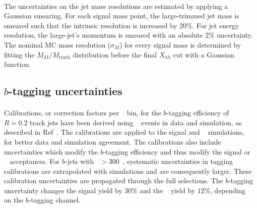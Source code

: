 \paragraph{}
The uncertainties on the jet mass resolutions are estimated by applying a Gaussian smearing.
For each signal mass point, the large-\R trimmed jet mass is smeared such that the intrinsic resolution is increased by 20\%. 
For jet energy resolution, the large-\R jet's momentum is smeared with an absolute $2\%$ uncertainty. 
The nominal MC mass resolution ($\sigma_{M}$) for every signal mass is determined by fitting the $M_\text{JJ} / M_\text{truth}$ distribution before the final $X_{hh}$ cut with a Gaussian function.


\subsection{$b$-tagging uncertainties}
\label{sec:b-tagging-unc}
\paragraph{}
Calibrations, or correction factors per \pt~ bin, for the $b$-tagging efficiency of $R=0.2$ track jets have been derived using \ttbar~ events in data and simulation, as described in Ref~\cite{Aad:2015ydr, ATL-COM-PHYS-2015-009, ATL-COM-PHYS-2015-1323}.
The calibrations are applied to the signal and \ttbar~ simulations, for better data and simulation agreement.  
The calibrations also include uncertainties which modify the $b$-tagging efficiency and thus modify the signal or \ttbar~ acceptances.
For $b$-jets with \pt~$> 300$~\GeV, systematic uncertainties in tagging calibrations are extrapolated with simulations and are consequently larger.
These calibration uncertainties are propagated through the full selections.
The $b$-tagging uncertainty changes the signal yield by $30\%$ and the \ttbar~ yield by $12\%$, depending on the $b$-tagging channel.

